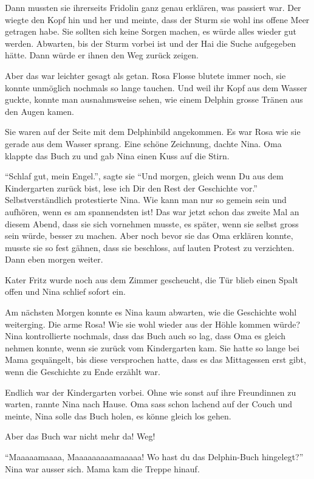 Dann mussten sie ihrerseits Fridolin ganz genau erklären, was passiert war. Der wiegte den Kopf hin und her und meinte, dass der Sturm sie wohl ins offene Meer getragen habe. Sie sollten sich keine Sorgen machen, es würde alles wieder gut werden. Abwarten, bis der Sturm vorbei ist und der Hai die Suche aufgegeben hätte. Dann würde er ihnen den Weg zurück zeigen.

Aber das war leichter gesagt als getan. Rosa Flosse blutete immer noch, sie konnte unmöglich nochmals so lange tauchen. Und weil ihr Kopf aus dem Wasser guckte, konnte man ausnahmsweise sehen, wie einem Delphin grosse Tränen aus den Augen kamen.

\begin{mdframed}[style=mystyle]
Sie waren auf der Seite mit dem Delphinbild angekommen. Es war Rosa wie sie gerade aus dem Wasser sprang. Eine schöne Zeichnung, dachte Nina. Oma klappte das Buch zu und gab Nina einen Kuss auf die Stirn.

\enquote{Schlaf gut, mein Engel.}, sagte sie \enquote{Und morgen, gleich wenn Du aus dem Kindergarten zurück bist, lese ich Dir den Rest der Geschichte vor.} Selbstverständlich protestierte Nina. Wie kann man nur so gemein sein und aufhören, wenn es am spannendsten ist! Das war jetzt schon das zweite Mal an diesem Abend, dass sie sich vornehmen musste, es später, wenn sie selbst gross sein würde, besser zu machen. Aber noch bevor sie das Oma erklären konnte, musste sie so fest gähnen, dass sie beschloss, auf lauten Protest zu verzichten. Dann eben morgen weiter.

Kater Fritz wurde noch aus dem Zimmer gescheucht, die Tür blieb einen Spalt offen und Nina schlief sofort ein.


Am nächsten Morgen konnte es Nina kaum abwarten, wie die Geschichte wohl weiterging. Die arme Rosa! Wie sie wohl wieder aus der Höhle kommen würde? Nina kontrollierte nochmals, dass das Buch auch so lag, dass Oma es gleich nehmen konnte, wenn sie zurück vom Kindergarten kam. Sie hatte so lange bei Mama gequängelt, bis diese versprochen hatte, dass es das Mittagessen erst gibt, wenn die Geschichte zu Ende erzählt war.

Endlich war der Kindergarten vorbei. Ohne wie sonst auf ihre Freundinnen zu warten, rannte Nina nach Hause. Oma sass schon lachend auf der Couch und meinte, Nina solle das Buch holen, es könne gleich los gehen.

Aber das Buch war nicht mehr da! Weg!

\enquote{Maaaaamaaaa, Maaaaaaaaamaaaaa! Wo hast du das Delphin-Buch hingelegt?} Nina war ausser sich. Mama kam die Treppe hinauf.


\end{mdframed}
